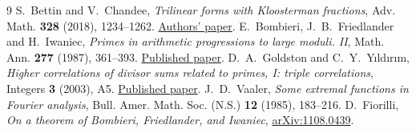 \documentclass[11pt]{article}
\begin{document}
\begin{thebibliography}{9}
 S.~Bettin and V.~Chandee,
\emph{Trilinear forms with Kloosterman fractions},
Adv. Math. \textbf{328} (2018), 1234--1262.
\href{https://arxiv.org/abs/1502.00769}{Authors' paper}.
 E.~Bombieri, J.~B.~Friedlander and H.~Iwaniec,
\emph{Primes in arithmetic progressions to large moduli. II},
Math. Ann. \textbf{277} (1987), 361--393.
\href{https://doi.org/10.1007/BF01458321}{Published paper}.
 D.~A.~Goldston and C.~Y.~Y{\i}ld{\i}r{\i}m,
\emph{Higher correlations of divisor sums related to primes, I:
triple correlations}, Integers \textbf{3} (2003), A5.
\href{https://math.colgate.edu/~integers/d5/d5.pdf}{Published paper}.
 J.~D.~Vaaler,
\emph{Some extremal functions in Fourier analysis},
Bull. Amer. Math. Soc. (N.S.) \textbf{12} (1985), 183--216.
 D.~Fiorilli,
\emph{On a theorem of Bombieri, Friedlander, and Iwaniec},
\href{https://arxiv.org/abs/1108.0439}{arXiv:1108.0439}.
\end{thebibliography}
\end{document}
